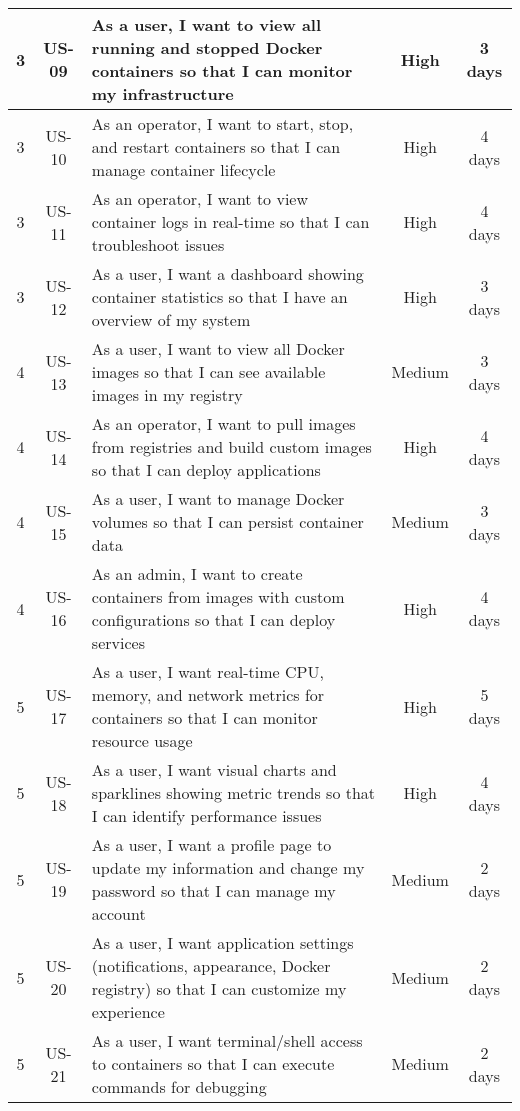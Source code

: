 \begin{longtable}{|c|c|p{8cm}|c|c|}
3 & US-09 & As a user, I want to view all running and stopped Docker containers so that I can monitor my infrastructure & High & 3 days \\ \hline
3 & US-10 & As an operator, I want to start, stop, and restart containers so that I can manage container lifecycle & High & 4 days \\ \hline
3 & US-11 & As an operator, I want to view container logs in real-time so that I can troubleshoot issues & High & 4 days \\ \hline
3 & US-12 & As a user, I want a dashboard showing container statistics so that I have an overview of my system & High & 3 days \\ \hline

4 & US-13 & As a user, I want to view all Docker images so that I can see available images in my registry & Medium & 3 days \\ \hline
4 & US-14 & As an operator, I want to pull images from registries and build custom images so that I can deploy applications & High & 4 days \\ \hline
4 & US-15 & As a user, I want to manage Docker volumes so that I can persist container data & Medium & 3 days \\ \hline
4 & US-16 & As an admin, I want to create containers from images with custom configurations so that I can deploy services & High & 4 days \\ \hline

5 & US-17 & As a user, I want real-time CPU, memory, and network metrics for containers so that I can monitor resource usage & High & 5 days \\ \hline
5 & US-18 & As a user, I want visual charts and sparklines showing metric trends so that I can identify performance issues & High & 4 days \\ \hline
5 & US-19 & As a user, I want a profile page to update my information and change my password so that I can manage my account & Medium & 2 days \\ \hline
5 & US-20 & As a user, I want application settings (notifications, appearance, Docker registry) so that I can customize my experience & Medium & 2 days \\ \hline
5 & US-21 & As a user, I want terminal/shell access to containers so that I can execute commands for debugging & Medium & 2 days \\ \hline


\end{longtable}
